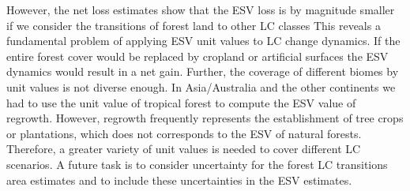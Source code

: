 		However, the net loss estimates show that the \ac{ESV} loss is by magnitude smaller if we consider the transitions of forest land to other \ac{LC} classes This reveals a fundamental problem of applying \ac{ESV} unit values to \ac{LC} change dynamics. If the entire forest cover would be replaced by cropland or artificial surfaces the \ac{ESV} dynamics would result in a net gain. Further, the coverage of different biomes by unit values is not diverse enough. In Asia/Australia and the other continents we had to use the unit value of tropical forest to compute the \ac{ESV} value of regrowth. However, regrowth frequently represents the establishment of tree crops or plantations, which does not corresponds to the \ac{ESV} of natural forests. Therefore, a greater variety of unit values is needed to cover different \ac{LC} scenarios. A future task is to consider uncertainty for the forest \ac{LC} transitions area estimates and to include these uncertainties in the \ac{ESV} estimates.